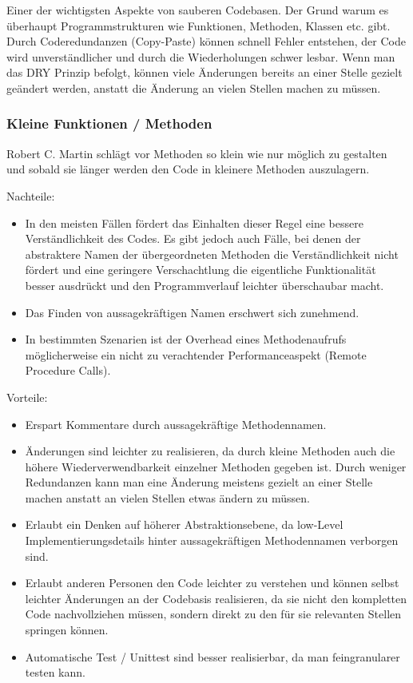 Einer der wichtigsten Aspekte von sauberen Codebasen. Der Grund warum es überhaupt 
Programmstrukturen wie Funktionen, Methoden, Klassen etc. gibt.
Durch Coderedundanzen (Copy-Paste) können schnell Fehler entstehen, der Code
wird unverständlicher und durch die Wiederholungen schwer lesbar.
Wenn man das DRY Prinzip befolgt, können viele Änderungen bereits an
einer Stelle gezielt geändert werden, anstatt die Änderung an vielen Stellen
machen zu müssen.

\subsubsection{Kleine Funktionen / Methoden}

Robert C. Martin schlägt vor Methoden so klein wie nur möglich zu gestalten und sobald 
sie länger werden den Code in kleinere Methoden auszulagern.

\bigskip
Nachteile:
\begin{itemize}
\item In den meisten Fällen fördert das Einhalten dieser Regel eine bessere Verständlichkeit
des Codes. Es gibt jedoch auch Fälle, bei denen der abstraktere Namen der übergeordneten Methoden die Verständlichkeit nicht
fördert und eine geringere Verschachtlung die eigentliche Funktionalität besser
ausdrückt und den Programmverlauf leichter überschaubar macht.
\item Das Finden von aussagekräftigen Namen erschwert sich zunehmend.
\item In bestimmten Szenarien ist der Overhead eines Methodenaufrufs möglicherweise
ein nicht zu verachtender Performanceaspekt (Remote Procedure Calls).
\end{itemize}
\bigskip
Vorteile:
\begin{itemize}
\item Erspart Kommentare durch aussagekräftige Methodennamen.
\item Änderungen sind leichter zu realisieren, da durch kleine Methoden auch die
höhere Wiederverwendbarkeit einzelner Methoden gegeben ist. Durch weniger Redundanzen kann man
eine Änderung meistens gezielt an einer Stelle machen anstatt an vielen
Stellen etwas ändern zu müssen.
\item Erlaubt ein Denken auf höherer Abstraktionsebene, da low-Level
Implementierungsdetails hinter aussagekräftigen Methodennamen verborgen sind.
\item Erlaubt anderen Personen den Code leichter zu verstehen und  können selbst
leichter Änderungen an der Codebasis realisieren, da sie nicht den kompletten
Code nachvollziehen müssen, sondern direkt zu den für sie relevanten Stellen
springen können.
\item Automatische Test / Unittest sind besser realisierbar, da man feingranularer
testen kann.
\end{itemize}

